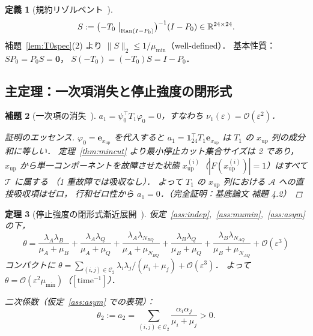 \documentclass[12pt,a4paper]{article}
\theoremstyle{plain}
\newtheorem{theorem}{定理}[section]
\newtheorem{lemma}[theorem]{補題}
\theoremstyle{definition}
\newtheorem{definition}[theorem]{定義}
\theoremstyle{remark}
\newcommand{\calO}{\mathcal{O}}        %
\newcommand{\calA}{\mathcal{A}}        %
\newcommand{\calT}{\mathcal{T}}        %
\newcommand{\eps}{\varepsilon}         %
\newcommand{\RedRes}{S}                %
\newcommand{\Proj}{P}                  %
\newcommand{\calCtwo}{\mathcal{C}_2}   %
\begin{document}
\begin{definition}[規約リゾルベント~{\cite{habase:v7}}]\label{def:riesz}
  \begin{equation}\label{eq:Sdef}
    \RedRes
    := \bigl(-T_0 \bigm|_{\mathrm{Ran}(I-\Proj_0)}\bigr)^{-1}(I-\Proj_0)
    \in \mathbb{R}^{24\times 24}.
  \end{equation}
  補題~\ref{lem:T0spec}(2) より $\|\RedRes\|_2 \le 1/\mu_{\min}$（well-defined）．
  基本性質：$\RedRes\Proj_0 = \Proj_0\RedRes = \mathbf{0}$，
  $\RedRes(-T_0) = (-T_0)\RedRes = I-\Proj_0$．
\end{definition}

\subsection{主定理：一次項消失と停止強度の閉形式}

\begin{lemma}[一次項の消失~{\cite{habase:v7}}]\label{lem:a1zero}
  $a_1 = \psi_0^\top T_1\varphi_0 = 0$，すなわち $\nu_1(\eps) = \calO(\eps^2)$．

  \begin{proof}[証明のエッセンス]
    $\varphi_0 = \mathbf{e}_{x_{\mathrm{up}}}$ を代入すると
    $a_1 = \mathbf{1}_{24}^\top T_1\mathbf{e}_{x_{\mathrm{up}}}$
    は $T_1$ の $x_{\mathrm{up}}$ 列の成分和に等しい．
    定理~\ref{thm:mincut} より最小停止カット集合サイズは 2 であり，
    $x_{\mathrm{up}}$ から単一コンポーネントを故障させた状態
    $x_{\mathrm{up}}^{(i)}$（$|F(x_{\mathrm{up}}^{(i)})|=1$）はすべて $\calT$ に属する
    （1 重故障では吸収なし）．
    よって $T_1$ の $x_{\mathrm{up}}$ 列における $\calA$ への直接吸収項はゼロ，
    行和ゼロ性から $a_1=0$．\quad（完全証明：基底論文 補題 4.2）
  \end{proof}
\end{lemma}

\begin{theorem}[停止強度の閉形式漸近展開~{\cite{habase:v7}}]\label{thm:theta_main}
  仮定~\ref{ass:indep},~\ref{ass:mumin},~\ref{ass:asym} の下，
  \begin{equation}\label{eq:theta_main}
    \boxed{
    \theta
    = \frac{\lambda_A\lambda_B}{\mu_A+\mu_B}
    + \frac{\lambda_A\lambda_Q}{\mu_A+\mu_Q}
    + \frac{\lambda_A\lambda_{N_{BQ}}}{\mu_A+\mu_{N_{BQ}}}
    + \frac{\lambda_B\lambda_Q}{\mu_B+\mu_Q}
    + \frac{\lambda_B\lambda_{N_{AQ}}}{\mu_B+\mu_{N_{AQ}}}
    + \calO(\eps^3)
    }
  \end{equation}
  コンパクトに
  $\theta = \sum_{(i,j)\in\calCtwo}\lambda_i\lambda_j/(\mu_i+\mu_j) + \calO(\eps^3)$．
  よって $\theta = \calO(\eps^2\mu_{\min})$（$[\mathrm{time}^{-1}]$）．

  二次係数（仮定~\ref{ass:asym} での表現）：
  \begin{equation}\label{eq:theta2}
    \theta_2 := a_2
    = \sum_{(i,j)\in\calCtwo}\frac{\alpha_i\alpha_j}{\mu_i+\mu_j}
    > 0.
  \end{equation}
\end{theorem}
\end{document}
